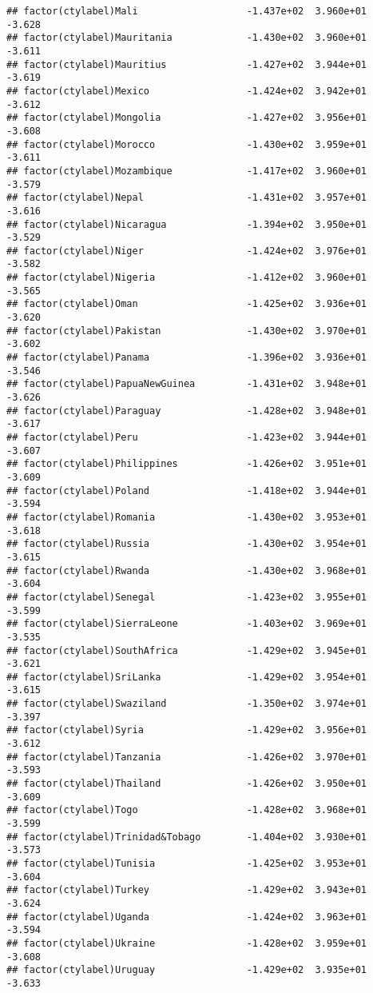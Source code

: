 \documentclass[12pt]{article}\usepackage[]{graphicx}\usepackage[]{color}
\makeatletter
\newenvironment{kframe}{%
 \def\at@end@of@kframe{}%
 \ifinner\ifhmode%
  \def\at@end@of@kframe{\end{minipage}}%
  \begin{minipage}{\columnwidth}%
 \fi\fi%
 \def\FrameCommand##1{\hskip\@totalleftmargin \hskip-\fboxsep
 \colorbox{shadecolor}{##1}\hskip-\fboxsep
     \hskip-\linewidth \hskip-\@totalleftmargin \hskip\columnwidth}%
 \MakeFramed {\advance\hsize-\width
   \@totalleftmargin\z@ \linewidth\hsize
   \@setminipage}}%
 {\par\unskip\endMakeFramed%
 \at@end@of@kframe}
\newenvironment{knitrout}{}{} %
\makeatother
\begin{document}
\begin{knitrout}
\begin{kframe}
\begin{verbatim}
## factor(ctylabel)Mali                   -1.437e+02  3.960e+01  -3.628
## factor(ctylabel)Mauritania             -1.430e+02  3.960e+01  -3.611
## factor(ctylabel)Mauritius              -1.427e+02  3.944e+01  -3.619
## factor(ctylabel)Mexico                 -1.424e+02  3.942e+01  -3.612
## factor(ctylabel)Mongolia               -1.427e+02  3.956e+01  -3.608
## factor(ctylabel)Morocco                -1.430e+02  3.959e+01  -3.611
## factor(ctylabel)Mozambique             -1.417e+02  3.960e+01  -3.579
## factor(ctylabel)Nepal                  -1.431e+02  3.957e+01  -3.616
## factor(ctylabel)Nicaragua              -1.394e+02  3.950e+01  -3.529
## factor(ctylabel)Niger                  -1.424e+02  3.976e+01  -3.582
## factor(ctylabel)Nigeria                -1.412e+02  3.960e+01  -3.565
## factor(ctylabel)Oman                   -1.425e+02  3.936e+01  -3.620
## factor(ctylabel)Pakistan               -1.430e+02  3.970e+01  -3.602
## factor(ctylabel)Panama                 -1.396e+02  3.936e+01  -3.546
## factor(ctylabel)PapuaNewGuinea         -1.431e+02  3.948e+01  -3.626
## factor(ctylabel)Paraguay               -1.428e+02  3.948e+01  -3.617
## factor(ctylabel)Peru                   -1.423e+02  3.944e+01  -3.607
## factor(ctylabel)Philippines            -1.426e+02  3.951e+01  -3.609
## factor(ctylabel)Poland                 -1.418e+02  3.944e+01  -3.594
## factor(ctylabel)Romania                -1.430e+02  3.953e+01  -3.618
## factor(ctylabel)Russia                 -1.430e+02  3.954e+01  -3.615
## factor(ctylabel)Rwanda                 -1.430e+02  3.968e+01  -3.604
## factor(ctylabel)Senegal                -1.423e+02  3.955e+01  -3.599
## factor(ctylabel)SierraLeone            -1.403e+02  3.969e+01  -3.535
## factor(ctylabel)SouthAfrica            -1.429e+02  3.945e+01  -3.621
## factor(ctylabel)SriLanka               -1.429e+02  3.954e+01  -3.615
## factor(ctylabel)Swaziland              -1.350e+02  3.974e+01  -3.397
## factor(ctylabel)Syria                  -1.429e+02  3.956e+01  -3.612
## factor(ctylabel)Tanzania               -1.426e+02  3.970e+01  -3.593
## factor(ctylabel)Thailand               -1.426e+02  3.950e+01  -3.609
## factor(ctylabel)Togo                   -1.428e+02  3.968e+01  -3.599
## factor(ctylabel)Trinidad&Tobago        -1.404e+02  3.930e+01  -3.573
## factor(ctylabel)Tunisia                -1.425e+02  3.953e+01  -3.604
## factor(ctylabel)Turkey                 -1.429e+02  3.943e+01  -3.624
## factor(ctylabel)Uganda                 -1.424e+02  3.963e+01  -3.594
## factor(ctylabel)Ukraine                -1.428e+02  3.959e+01  -3.608
## factor(ctylabel)Uruguay                -1.429e+02  3.935e+01  -3.633

\end{verbatim}
\end{kframe}
\end{knitrout}
\end{document}
